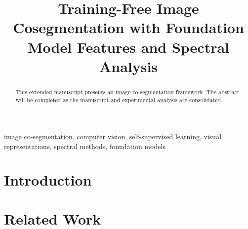 \documentclass[conference]{IEEEtran}
\begin{document}
\title{Training-Free Image Cosegmentation with Foundation Model Features and Spectral Analysis}

\author{
\and
{}
}

\maketitle

\begin{abstract}
This extended manuscript presents an image co-segmentation framework.
The abstract will be completed as the manuscript and experimental analysis
are consolidated.
\end{abstract}

\begin{IEEEkeywords}
image co-segmentation, computer vision, self-supervised learning,
visual representations, spectral methods, foundation models
\end{IEEEkeywords}

\section{Introduction}


\section{Related Work}

\end{document}
